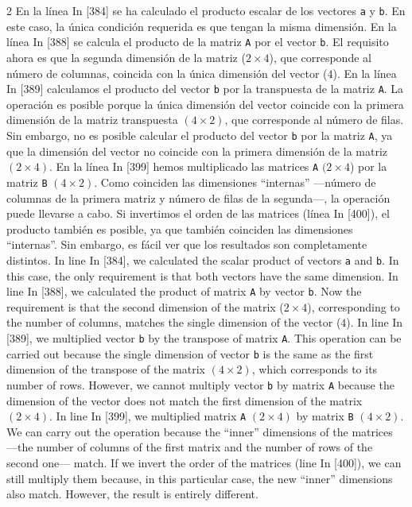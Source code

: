 \begin{paracol}{2}
En la línea In [384] se ha calculado el producto escalar de los vectores \texttt{a} y \texttt{b}. En este caso, la única condición requerida es que tengan la misma dimensión. En la línea In [388] se calcula el producto de la matriz \texttt{A} por el vector \texttt{b}. El requisito ahora es que la segunda dimensión de la matriz ($2\times 4$), que corresponde al número de columnas, coincida con la única dimensión del vector ($4$). En la línea In [389] calculamos el producto del vector \texttt{b} por la transpuesta de la matriz \texttt{A}. La operación es posible porque la única dimensión del vector coincide con la primera dimensión de la matriz transpuesta $(4\times 2)$, que corresponde al número de filas. Sin embargo, no es posible calcular el producto del vector \texttt{b} por la matriz \texttt{A}, ya que la dimensión del vector no coincide con la primera dimensión de la matriz $(2\times4)$. En la línea In [399] hemos multiplicado las matrices \texttt{A} $(2\times 4$) por la matriz \texttt{B} $(4\times 2)$. Como coinciden las dimensiones ``internas'' ---número de columnas de la primera matriz y número de filas de la segunda---, la operación puede llevarse a cabo. Si invertimos el orden de las matrices (línea In [400]), el producto también es posible, ya que también coinciden las dimensiones ``internas''. Sin embargo, es fácil ver que los resultados son completamente distintos.
\switchcolumn
In line In [384], we calculated the scalar product of vectors \texttt{a} and \texttt{b}. In this case, the only requirement is that both vectors have the same dimension. In line In [388], we calculated the product of matrix \texttt{A} by vector \texttt{b}. Now the requirement is that the second dimension of the matrix ($2\times 4$), corresponding to the number of columns, matches the single dimension of the vector ($4$). In line In [389], we multiplied vector \texttt{b} by the transpose of matrix \texttt{A}. This operation can be carried out because the single dimension of vector \texttt{b} is the same as the first dimension of the transpose of the matrix $(4\times 2)$, which corresponds to its number of rows. However, we cannot multiply vector \texttt{b} by matrix \texttt{A} because the dimension of the vector does not match the first dimension of the matrix $(2\times 4)$. In line In [399], we multiplied matrix \texttt{A} $(2\times 4)$ by matrix \texttt{B} $(4\times 2)$. We can carry out the operation because the ``inner'' dimensions of the matrices ---the number of columns of the first matrix and the number of rows of the second one--- match. If we invert the order of the matrices (line In [400]), we can still multiply them because, in this particular case, the new ``inner'' dimensions also match. However, the result is entirely different.        
\end{paracol}

